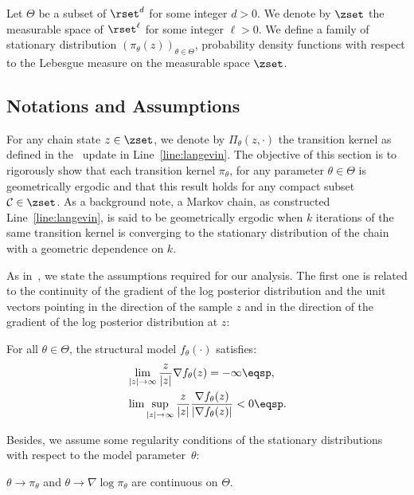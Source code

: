 \documentclass{article} %
\begin{document}
Let $\Theta$ be a subset of $\rset^d$ for some integer $d >0$.
We denote by $\zset$ the measurable space of $\rset^\ell$ for some integer $\ell >0$.
We define a family of stationary distribution $\left(\pi_\theta(z) \right)_{\theta \in \Theta}$, probability density functions with respect to the Lebesgue measure on the measurable space $\zset$. 

\subsection{Notations and Assumptions}
For any chain state $z \in \zset$, we denote by $\Pi_\theta(z,\cdot)$ the transition kernel as defined in the \algo\ update in Line~\ref{line:langevin}.
The objective of this section is to rigorously show that each transition kernel $\pi_\theta$, for any parameter $\theta \in \Theta$ is geometrically ergodic and that this result holds for any compact subset $\mathcal{C} \in \zset$.
As a background note, a Markov chain, as constructed Line~\ref{line:langevin}, is said to be geometrically ergodic when $k$ iterations of the same transition kernel is converging to the stationary distribution of the chain with a geometric dependence on $k$.

As in~\citet{allassonniere2015convergent}, we state the assumptions required for our analysis.
The first one is related to the continuity of the gradient of the log posterior distribution and the unit vectors pointing in the direction of the sample $z$ and in the direction of the gradient of the log posterior distribution at $z$:
\begin{assumption}\label{ass:bounded}
For all $\theta \in \Theta$, the structural model $f_\theta(\cdot)$ satisfies:
\begin{equation}\notag
\begin{split}
&\lim \limits_{|z| \to \infty} \frac{z}{|z|} \nabla f_{\theta}(z)  = - \infty \eqsp,\\
 &\lim \sup \limits_{|z| \to \infty} \frac{z}{|z|} \frac{\nabla f_{\theta}(z) }{|\nabla f_{\theta}(z) |} < 0 \eqsp.
\end{split}
\end{equation}
\end{assumption}

Besides, we assume some regularity conditions of the stationary distributions with respect to the model parameter~$\theta$:
\begin{assumption}\label{ass:contlogpi}
$\theta \to \pi_\theta$ and $\theta \to \nabla \log \pi_\theta$ are continuous on $\Theta$.
\end{assumption}
\end{document}
